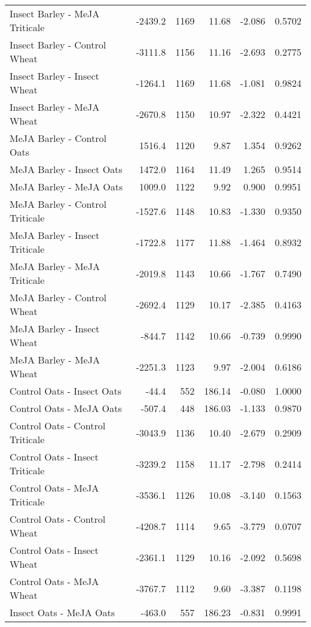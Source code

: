 \begin{table}[ht]
\begin{tabular}{lrrrrr}
        Insect Barley - MeJA Triticale &-2439.2 &1169 & 11.68 & -2.086 & 0.5702 \\
        Insect Barley - Control Wheat &-3111.8 &1156 & 11.16 & -2.693 & 0.2775 \\
        Insect Barley - Insect Wheat &-1264.1 &1169 & 11.68 & -1.081 & 0.9824 \\
        Insect Barley - MeJA Wheat &-2670.8 &1150 & 10.97 & -2.322 & 0.4421 \\
        MeJA Barley - Control Oats & 1516.4 &1120 & 9.87 & 1.354 & 0.9262 \\
        MeJA Barley - Insect Oats & 1472.0 &1164 & 11.49 & 1.265 & 0.9514 \\
        MeJA Barley - MeJA Oats & 1009.0 &1122 & 9.92 & 0.900 & 0.9951 \\
        MeJA Barley - Control Triticale &-1527.6 &1148 & 10.83 & -1.330 & 0.9350 \\
        MeJA Barley - Insect Triticale &-1722.8 &1177 & 11.88 & -1.464 & 0.8932 \\
        MeJA Barley - MeJA Triticale &-2019.8 &1143 & 10.66 & -1.767 & 0.7490 \\
        MeJA Barley - Control Wheat &-2692.4 &1129 & 10.17 & -2.385 & 0.4163 \\
        MeJA Barley - Insect Wheat & -844.7 &1142 & 10.66 & -0.739 & 0.9990 \\
        MeJA Barley - MeJA Wheat &-2251.3 &1123 & 9.97 & -2.004 & 0.6186 \\
        Control Oats - Insect Oats & -44.4 & 552 & 186.14 & -0.080 & 1.0000 \\
        Control Oats - MeJA Oats & -507.4 & 448 & 186.03 & -1.133 & 0.9870 \\
        Control Oats - Control Triticale &-3043.9 &1136 & 10.40 & -2.679 & 0.2909 \\
        Control Oats - Insect Triticale &-3239.2 &1158 & 11.17 & -2.798 & 0.2414 \\
        Control Oats - MeJA Triticale &-3536.1 &1126 & 10.08 & -3.140 & 0.1563 \\
        Control Oats - Control Wheat &-4208.7 &1114 & 9.65 & -3.779 & 0.0707 \\
        Control Oats - Insect Wheat &-2361.1 &1129 & 10.16 & -2.092 & 0.5698 \\
        Control Oats - MeJA Wheat &-3767.7 &1112 & 9.60 & -3.387 & 0.1198 \\
        Insect Oats - MeJA Oats & -463.0 & 557 & 186.23 & -0.831 & 0.9991 \\

\end{tabular}
\end{table}
